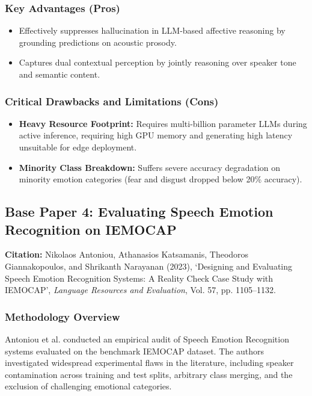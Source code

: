 \subsubsection{Key Advantages (Pros)}
\begin{itemize}
    \item Effectively suppresses hallucination in LLM-based affective reasoning by grounding predictions on acoustic prosody.
    \item Captures dual contextual perception by jointly reasoning over speaker tone and semantic content.
\end{itemize}

\subsubsection{Critical Drawbacks and Limitations (Cons)}
\begin{itemize}
    \item \textbf{Heavy Resource Footprint:} Requires multi-billion parameter LLMs during active inference, requiring high GPU memory and generating high latency unsuitable for edge deployment.
    \item \textbf{Minority Class Breakdown:} Suffers severe accuracy degradation on minority emotion categories (fear and disgust dropped below 20\% accuracy).
\end{itemize}

\subsection{Base Paper 4: Evaluating Speech Emotion Recognition on IEMOCAP}
\textbf{Citation:} Nikolaos Antoniou, Athanasios Katsamanis, Theodoros Giannakopoulos, and Shrikanth Narayanan (2023), `Designing and Evaluating Speech Emotion Recognition Systems: A Reality Check Case Study with IEMOCAP', \textit{Language Resources and Evaluation}, Vol. 57, pp. 1105--1132.

\subsubsection{Methodology Overview}
Antoniou et al. conducted an empirical audit of Speech Emotion Recognition systems evaluated on the benchmark IEMOCAP dataset. The authors investigated widespread experimental flaws in the literature, including speaker contamination across training and test splits, arbitrary class merging, and the exclusion of challenging emotional categories.

